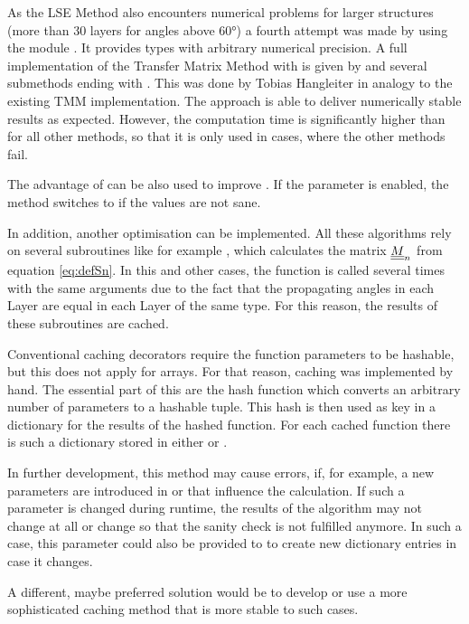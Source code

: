 As the LSE Method also encounters numerical problems for larger structures
(more than 30 layers for angles above $\ang{60}$) a
fourth attempt was made by using the module . It provides
types with arbitrary numerical precision. A full implementation of the Transfer
Matrix Method with  is given by  and
several submethods ending with . This was done by Tobias Hangleiter in
analogy to the existing TMM implementation.
The  approach is able to deliver numerically stable results as
expected. However, the computation time is significantly higher than for all
other methods, so that it is only used in cases, where the other methods fail.

The advantage of  can be also used to improve
. If the parameter  is enabled, the
method switches to  if the values are not sane.

In addition, another optimisation can be implemented. All these algorithms rely
on several subroutines like for example , which
calculates the matrix $\underline{\underline{M}}_n$ from equation \ref{eq:defSn}. In this and
other cases, the function is called several times with the same arguments due
to the fact that the propagating angles in each Layer are equal in each Layer
of the same type. For this reason, the results of these subroutines are cached.

Conventional caching decorators require the function parameters to be
hashable, but this does not apply for  arrays. For that reason,
caching was implemented by hand. The essential part of this are the hash
function  which converts an arbitrary number of parameters to a
hashable tuple. This hash is then used as key in a dictionary for the results
of the
hashed function. For each cached function there is such a dictionary stored in
either  or .

In further development, this method may cause errors, if, for example, a new
parameters are introduced in  or  that influence the
calculation. If such a parameter is changed during runtime, the results of the
algorithm may not change at all or change so that the sanity check is not
fulfilled anymore. In such a case, this parameter could also be provided to
 to create new dictionary entries in case it changes.

A different, maybe preferred solution would be to develop or use a more
sophisticated caching method that is more stable to such cases.

